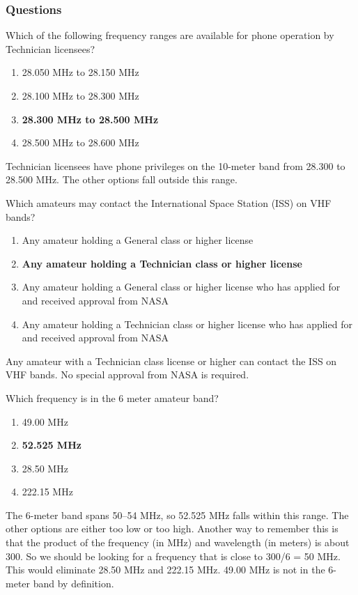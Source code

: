 \subsubsection*{Questions}
\begin{tcolorbox}[colback=gray!10!white,colframe=black!75!black,title={T1B01}]
    Which of the following frequency ranges are available for phone operation by Technician licensees?
    \begin{enumerate}[label=\Alph*),noitemsep]
        \item 28.050 MHz to 28.150 MHz
        \item 28.100 MHz to 28.300 MHz
        \item \textbf{28.300 MHz to 28.500 MHz}
        \item 28.500 MHz to 28.600 MHz
    \end{enumerate}
\end{tcolorbox}
Technician licensees have phone privileges on the 10-meter band from 28.300 to 28.500 MHz. The other options fall outside this range.

\begin{tcolorbox}[colback=gray!10!white,colframe=black!75!black,title={T1B02}]
    Which amateurs may contact the International Space Station (ISS) on VHF bands?
    \begin{enumerate}[label=\Alph*),noitemsep]
        \item Any amateur holding a General class or higher license
        \item \textbf{Any amateur holding a Technician class or higher license}
        \item Any amateur holding a General class or higher license who has applied for and received approval from NASA
        \item Any amateur holding a Technician class or higher license who has applied for and received approval from NASA
    \end{enumerate}
\end{tcolorbox}
Any amateur with a Technician class license or higher can contact the ISS on VHF bands. No special approval from NASA is required.

\begin{tcolorbox}[colback=gray!10!white,colframe=black!75!black,title={T1B03}]
    Which frequency is in the 6 meter amateur band?
    \begin{enumerate}[label=\Alph*),noitemsep]
        \item 49.00 MHz
        \item \textbf{52.525 MHz}
        \item 28.50 MHz
        \item 222.15 MHz
    \end{enumerate}
\end{tcolorbox}
The 6-meter band spans 50–54 MHz, so 52.525 MHz falls within this range. The other options are either too low or too high. Another way to remember this is that the product of the frequency (in MHz) and wavelength (in meters) is about 300. So we should be looking for a frequency that is close to 300/6 = 50 MHz. This would eliminate 28.50 MHz and 222.15 MHz. 49.00 MHz is not in the 6-meter band by definition.

